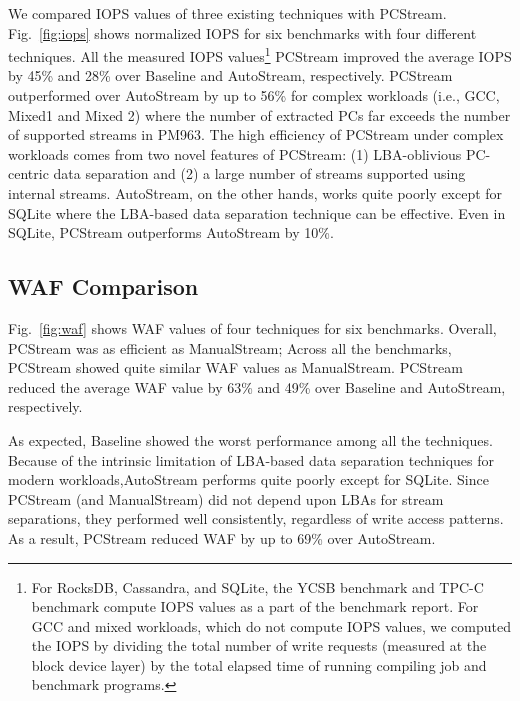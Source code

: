 We compared IOPS values of three existing techniques with \textsf{\small PCStream}.
Fig.~\ref{fig:iops} shows normalized IOPS for six benchmarks with four different
techniques. All the measured IOPS values\footnote{
For RocksDB, Cassandra, and SQLite, the YCSB benchmark and TPC-C benchmark
compute IOPS values as a part of the benchmark report.
For GCC and mixed workloads, which do not compute IOPS values,
we computed the IOPS by dividing the total number of write requests (measured 
at the block device layer) by the total elapsed time of running 
compiling job and benchmark programs.
}
\textsf{\small PCStream} improved the average IOPS by 45\% and 28\% over 
\textsf{\small Baseline} and \textsf{\small AutoStream}, respectively.
\textsf{\small PCStream} outperformed over \textsf{\small AutoStream}
by up to 56\% for complex workloads (i.e., GCC, Mixed1 and Mixed 2) where
the number of extracted PCs far exceeds the number of supported streams
in PM963. The high efficiency of \textsf{\small PCStream} under complex
workloads comes from two novel features of \textsf{\small PCStream}: (1) LBA-oblivious 
PC-centric data separation and (2) a large number of streams supported 
using internal streams. \textsf{\small AutoStream}, on the other hands,
works quite poorly except for SQLite where the LBA-based data separation
technique can be effective.
Even in SQLite, \textsf{\small PCStream} outperforms \textsf{\small AutoStream}
by 10\%.

\vspace{-10pt}
\subsection{WAF Comparison}
\vspace{-5pt}

Fig.~\ref{fig:waf} shows WAF values of four techniques for six benchmarks.
Overall, \textsf{\small PCStream} was as efficient as \textsf{\small ManualStream}; 
Across all the
benchmarks, \textsf{\small PCStream} showed quite similar WAF values as
\textsf{\small ManualStream}. \textsf{\small PCStream} reduced the average WAF value
by 63\% and 49\% over
\textsf{\small Baseline} and \textsf{\small AutoStream}, respectively.  

As expected, \textsf{\small Baseline} showed the worst performance among all the
techniques. Because of the intrinsic limitation of LBA-based data separation
techniques for modern workloads,\textsf{\small AutoStream} performs quite poorly
except for SQLite.
Since \textsf{\small PCStream} (and \textsf{\small ManualStream}) did not
depend upon LBAs for stream separations, they performed well consistently,
regardless of write access patterns.
As a result, \textsf{\small PCStream} reduced WAF by up to 69\% over 
\textsf{\small AutoStream}.

